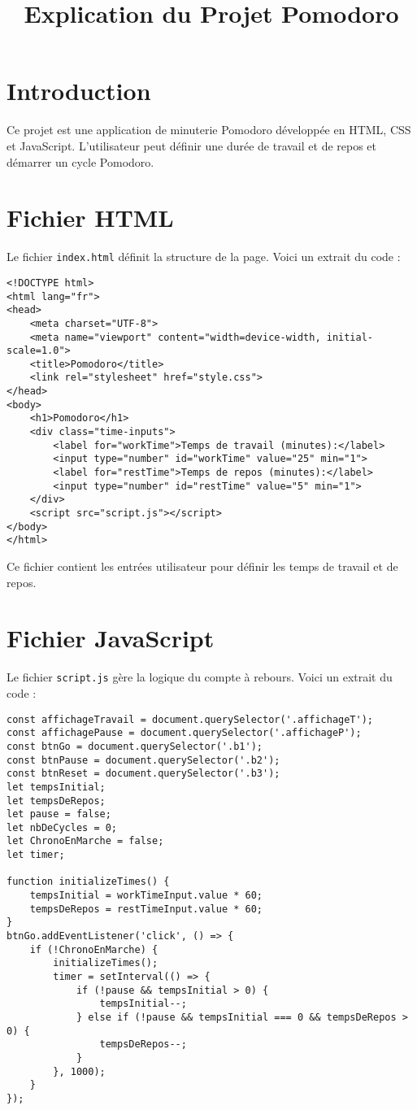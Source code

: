 \documentclass{article}
\title{Explication du Projet Pomodoro}
\author{}
\date{}
\begin{document}
\maketitle

\section{Introduction}
Ce projet est une application de minuterie Pomodoro développée en HTML, CSS et JavaScript. L'utilisateur peut définir une durée de travail et de repos et démarrer un cycle Pomodoro.

\section{Fichier HTML}
Le fichier \texttt{index.html} définit la structure de la page. Voici un extrait du code :

\begin{lstlisting}[style=customhtml]
<!DOCTYPE html>
<html lang="fr">
<head>
    <meta charset="UTF-8">
    <meta name="viewport" content="width=device-width, initial-scale=1.0">
    <title>Pomodoro</title>
    <link rel="stylesheet" href="style.css">
</head>
<body>
    <h1>Pomodoro</h1>
    <div class="time-inputs">
        <label for="workTime">Temps de travail (minutes):</label>
        <input type="number" id="workTime" value="25" min="1">
        <label for="restTime">Temps de repos (minutes):</label>
        <input type="number" id="restTime" value="5" min="1">
    </div>
    <script src="script.js"></script>
</body>
</html>
\end{lstlisting}

Ce fichier contient les entrées utilisateur pour définir les temps de travail et de repos.

\section{Fichier JavaScript}
Le fichier \texttt{script.js} gère la logique du compte à rebours. Voici un extrait du code :

\begin{lstlisting}[style=customjs]
const affichageTravail = document.querySelector('.affichageT');
const affichagePause = document.querySelector('.affichageP');
const btnGo = document.querySelector('.b1');
const btnPause = document.querySelector('.b2');
const btnReset = document.querySelector('.b3');
let tempsInitial;
let tempsDeRepos;
let pause = false;
let nbDeCycles = 0;
let ChronoEnMarche = false;
let timer;

function initializeTimes() {
    tempsInitial = workTimeInput.value * 60;
    tempsDeRepos = restTimeInput.value * 60;
}
btnGo.addEventListener('click', () => {
    if (!ChronoEnMarche) {
        initializeTimes();
        timer = setInterval(() => {
            if (!pause && tempsInitial > 0) {
                tempsInitial--;
            } else if (!pause && tempsInitial === 0 && tempsDeRepos > 0) {
                tempsDeRepos--;
            }
        }, 1000);
    }
});
\end{lstlisting}
\end{document}
